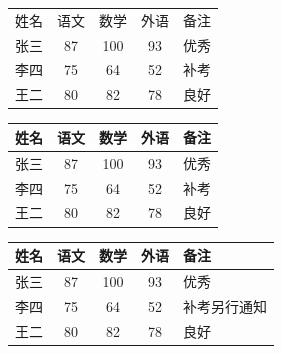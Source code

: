 \documentclass{ctexart}
\begin{document}
    \begin{tabular}{l c c c r} %
        姓名 & 语文 & 数学 & 外语 & 备注 \\
        张三 & 87 & 100 & 93 & 优秀 \\
        李四 & 75 & 64 & 52 & 补考 \\
        王二 & 80 & 82 & 78 & 良好 \\
    \end{tabular}

    \begin{tabular}{| l || c | c | c | r |}
        \hline
        姓名 & 语文 & 数学 & 外语 & 备注 \\
        \hline \hline
        张三 & 87 & 100 & 93 & 优秀 \\
        \hline
        李四 & 75 & 64 & 52 & 补考 \\
        \hline
        王二 & 80 & 82 & 78 & 良好 \\
        \hline
    \end{tabular}

    \begin{tabular}{| l || c | c | c | p{1.5cm} |} %
        \hline
        姓名 & 语文 & 数学 & 外语 & 备注 \\
        \hline \hline
        张三 & 87 & 100 & 93 & 优秀 \\
        \hline
        李四 & 75 & 64 & 52 & 补考另行通知 \\
        \hline
        王二 & 80 & 82 & 78 & 良好 \\
        \hline
    \end{tabular}
\end{document}
